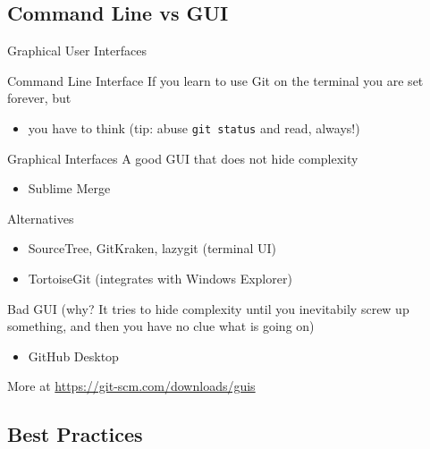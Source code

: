 \documentclass[xetex]{beamer}
\begin{document}

\subsection{Command Line vs GUI}

\begin{frame}{Graphical User Interfaces}
  \begin{block}{Command Line Interface}
    If you learn to use Git on the terminal you are set forever, but
    \begin{itemize}
      \item you have to think (tip: abuse \texttt{git status} and read, always!)
    \end{itemize}
  \end{block}
  \pause
  \begin{alertblock}{Graphical Interfaces}
    A good GUI that does not hide complexity
    \begin{itemize}
      \item Sublime Merge
    \end{itemize}
    Alternatives
    \begin{itemize}
      \item SourceTree, GitKraken, lazygit (terminal UI)
      \item TortoiseGit (integrates with Windows Explorer)
    \end{itemize}
    Bad GUI (why? It tries to hide complexity until you inevitabily screw up
    something, and then you have no clue what is going on)
    \begin{itemize}
      \item GitHub Desktop
    \end{itemize}
    More at \url{https://git-scm.com/downloads/guis}
  \end{alertblock}
\end{frame}

\subsection{Best Practices}
\end{document}
